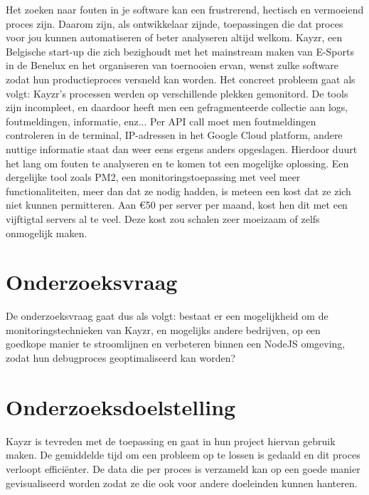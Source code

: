 Het zoeken naar fouten in je software kan een frustrerend, hectisch en vermoeiend proces zijn. Daarom zijn, als ontwikkelaar zijnde, toepassingen die dat proces voor jou kunnen automatiseren of beter analyseren altijd welkom. Kayzr, een Belgische start-up die zich bezighoudt met het mainstream maken van E-Sports in de Benelux en het organiseren van toernooien ervan, wenst zulke software zodat hun productieproces versneld kan worden. Het concreet probleem gaat als volgt: Kayzr's processen werden op verschillende plekken gemonitord. De tools zijn incompleet, en daardoor heeft men een gefragmenteerde collectie aan logs, foutmeldingen, informatie, enz...  Per API call moet men foutmeldingen controleren in de terminal, IP-adressen in het Google Cloud platform, andere nuttige informatie staat dan weer eens ergens anders opgeslagen. Hierdoor duurt het lang om fouten te analyseren en te komen tot een mogelijke oplossing. Een dergelijke tool zoals PM2, een monitoringstoepassing met veel meer functionaliteiten, meer dan dat ze nodig hadden, is meteen een kost dat ze zich niet kunnen permitteren. Aan \euro 50 per server per maand, kost hen dit met een vijftigtal servers al te veel. Deze kost zou schalen zeer moeizaam of zelfs onmogelijk maken.

\section{Onderzoeksvraag}
\label{sec:onderzoeksvraag}

De onderzoeksvraag gaat dus als volgt: bestaat er een mogelijkheid om de monitoringstechnieken van Kayzr, en mogelijks andere bedrijven, op een goedkope manier te stroomlijnen en verbeteren binnen een NodeJS omgeving, zodat hun debugproces geoptimaliseerd kan worden? 


\section{Onderzoeksdoelstelling}
\label{sec:onderzoeksdoelstelling}

Kayzr is tevreden met de toepassing en gaat in hun project hiervan gebruik maken. De gemiddelde tijd om een probleem op te lossen is gedaald en dit proces verloopt efficiënter. De data die per proces is verzameld kan op een goede manier gevisualiseerd worden zodat ze die ook voor andere doeleinden kunnen hanteren. 

